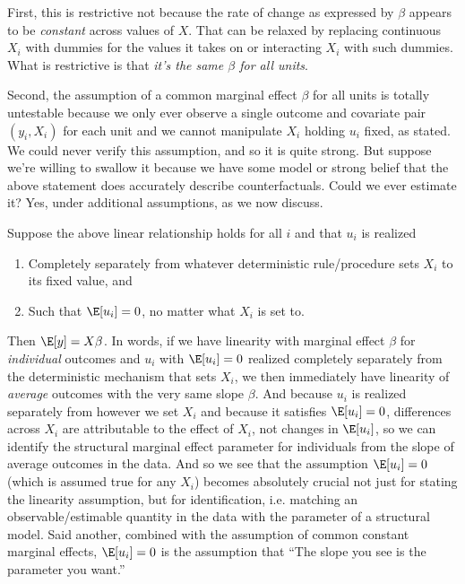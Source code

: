 \documentclass[12pt]{article}
\theoremstyle{plain}
\theoremstyle{definition}
\theoremstyle{remark}
\begin{document}
\begin{itemize}
    First, this is restrictive not because the rate of change as
    expressed by $\beta$ appears to be \emph{constant} across values of
    $X$. That can be relaxed by replacing continuous $X_i$ with dummies
    for the values it takes on or interacting $X_i$ with such dummies.
    What is restrictive is that
    \emph{it's the same $\beta$ for all units}.

    Second, the assumption of a common marginal effect $\beta$ for all
    units is totally untestable because we only ever observe a single
    outcome and covariate pair $(y_i,X_i)$ for each unit and we cannot
    manipulate $X_i$ holding $u_i$ fixed, as stated.
    We could never verify this assumption,
    and so it is quite strong.
    But suppose we're willing to swallow it because we have some model
    or strong belief that the above statement does accurately describe
    counterfactuals.
    Could we ever estimate it?  Yes, under additional assumptions, as we
    now discuss.

    Suppose the above linear relationship holds for all $i$ and that $u_i$
    is realized
    \begin{enumerate}[label=(\roman*)]
      \item Completely separately from whatever deterministic
        rule/procedure sets $X_i$ to its fixed value, and
      \item Such that $\E[u_i]=0$, no matter what $X_i$ is set to.
    \end{enumerate}
    Then $\E[y]=X\beta$.
    In words, if we have linearity with marginal effect $\beta$ for
    \emph{individual} outcomes and $u_i$ with $\E[u_i]=0$
    realized completely separately from the deterministic mechanism
    that sets $X_i$, we then immediately have linearity of
    \emph{average} outcomes with the very same slope $\beta$.
    And because $u_i$ is realized separately from however we set $X_i$
    and because it satisfies $\E[u_i]=0$, differences across $X_i$ are
    attributable to the effect of $X_i$, not changes in $\E[u_i]$,
    so we can identify the structural marginal effect parameter for
    individuals from the slope of average outcomes in the data.
    And so we see that the assumption $\E[u_i]=0$ (which is assumed true
    for any $X_i$) becomes absolutely crucial not just for stating the
    linearity assumption, but for identification, i.e. matching an
    observable/estimable quantity in the data with the parameter of a
    structural model.
    Said another, combined with the assumption of common constant
    marginal effects, $\E[u_i]=0$ is the assumption that ``The slope you
    see is the parameter you want.''


\end{itemize}
\end{document}
